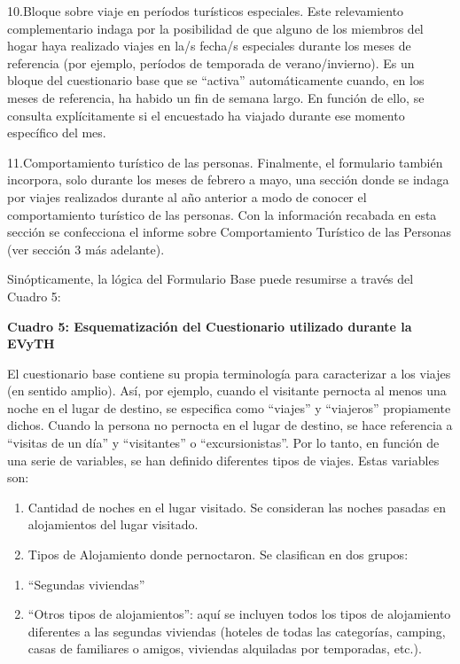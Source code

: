 \documentclass[
  openany]{book}
\providecommand{\tightlist}{%
  \setlength{\itemsep}{0pt}\setlength{\parskip}{0pt}}
\begin{document}
10.Bloque sobre viaje en períodos turísticos especiales.
Este relevamiento complementario indaga por la posibilidad de que alguno de los miembros del hogar haya realizado viajes en la/s fecha/s especiales durante los meses de referencia (por ejemplo, períodos de temporada de verano/invierno).
Es un bloque del cuestionario base que se ``activa'' automáticamente cuando, en los meses de referencia, ha habido un fin de semana largo.
En función de ello, se consulta explícitamente si el encuestado ha viajado durante ese momento específico del mes.

11.Comportamiento turístico de las personas.
Finalmente, el formulario también incorpora, solo durante los meses de febrero a mayo, una sección donde se indaga por viajes realizados durante al año anterior a modo de conocer el comportamiento turístico de las personas.
Con la información recabada en esta sección se confecciona el informe sobre Comportamiento Turístico de las Personas (ver sección 3 más adelante).

Sinópticamente, la lógica del Formulario Base puede resumirse a través del Cuadro 5:

\textbf{Cuadro 5: Esquematización del Cuestionario utilizado durante la EVyTH}

El cuestionario base contiene su propia terminología para caracterizar a los viajes (en sentido amplio).
Así, por ejemplo, cuando el visitante pernocta al menos una noche en el lugar de destino, se especifica como ``viajes'' y ``viajeros'' propiamente dichos.
Cuando la persona no pernocta en el lugar de destino, se hace referencia a ``visitas de un día'' y ``visitantes'' o ``excursionistas''.
Por lo tanto, en función de una serie de variables, se han definido diferentes tipos de viajes.
Estas variables son:

\begin{enumerate}
\def\labelenumi{\arabic{enumi}.}
\tightlist
\item
  Cantidad de noches en el lugar visitado. Se consideran las noches pasadas en alojamientos del lugar visitado.
\item
  Tipos de Alojamiento donde pernoctaron. Se clasifican en dos grupos:
\end{enumerate}

\begin{enumerate}
\def\labelenumi{\alph{enumi}.}
\tightlist
\item
  ``Segundas viviendas''
\item
  ``Otros tipos de alojamientos'': aquí se incluyen todos los tipos de alojamiento diferentes a las segundas viviendas (hoteles de todas las categorías, camping, casas de familiares o amigos, viviendas alquiladas por temporadas, etc.).
\end{enumerate}
\end{document}
